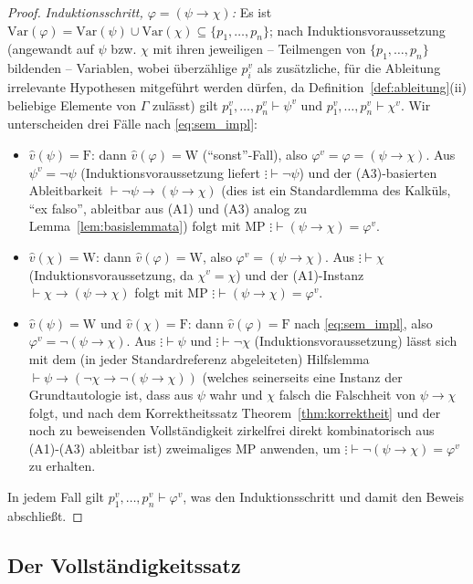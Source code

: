 \documentclass[12pt, a4paper]{article}
\theoremstyle{definition}
\theoremstyle{remark}
\newcommand{\W}{\mathrm{W}}
\newcommand{\F}{\mathrm{F}}
\newcommand{\Var}{\mathrm{Var}}
\begin{document}
\begin{proof}
\emph{Induktionsschritt, $\varphi=(\psi\to\chi)$:} Es ist $\Var(\varphi)=\Var(\psi)\cup\Var(\chi) \subseteq \{p_1,\dots,p_n\}$; nach Induktionsvoraussetzung (angewandt auf $\psi$ bzw. $\chi$ mit ihren jeweiligen -- Teilmengen von $\{p_1,\dots,p_n\}$ bildenden -- Variablen, wobei überzählige $p_i^v$ als zusätzliche, für die Ableitung irrelevante Hypothesen mitgeführt werden dürfen, da Definition~\ref{def:ableitung}(ii) beliebige Elemente von $\Gamma$ zulässt) gilt $p_1^v,\dots,p_n^v \vdash \psi^v$ und $p_1^v,\dots,p_n^v\vdash\chi^v$. Wir unterscheiden drei Fälle nach \eqref{eq:sem_impl}:
\begin{itemize}
  \item $\hat v(\psi)=\F$: dann $\hat v(\varphi)=\W$ (``sonst''-Fall), also $\varphi^v=\varphi=(\psi\to\chi)$. Aus $\psi^v=\neg\psi$ (Induktionsvoraussetzung liefert $\vdots\vdash\neg\psi$) und der (A3)-basierten Ableitbarkeit $\vdash \neg\psi\to(\psi\to\chi)$ (dies ist ein Standardlemma des Kalküls, ``ex falso'', ableitbar aus (A1) und (A3) analog zu Lemma~\ref{lem:basislemmata}) folgt mit MP $\vdots\vdash(\psi\to\chi)=\varphi^v$.
  \item $\hat v(\chi)=\W$: dann $\hat v(\varphi)=\W$, also $\varphi^v=(\psi\to\chi)$. Aus $\vdots\vdash\chi$ (Induktionsvoraussetzung, da $\chi^v=\chi$) und der (A1)-Instanz $\vdash \chi\to(\psi\to\chi)$ folgt mit MP $\vdots \vdash (\psi\to\chi)=\varphi^v$.
  \item $\hat v(\psi)=\W$ und $\hat v(\chi)=\F$: dann $\hat v(\varphi)=\F$ nach \eqref{eq:sem_impl}, also $\varphi^v=\neg(\psi\to\chi)$. Aus $\vdots\vdash\psi$ und $\vdots\vdash\neg\chi$ (Induktionsvoraussetzung) lässt sich mit dem (in jeder Standardreferenz abgeleiteten) Hilfslemma $\vdash \psi\to(\neg\chi\to\neg(\psi\to\chi))$ (welches seinerseits eine Instanz der Grundtautologie ist, dass aus $\psi$ wahr und $\chi$ falsch die Falschheit von $\psi\to\chi$ folgt, und nach dem Korrektheitssatz Theorem~\ref{thm:korrektheit} und der noch zu beweisenden Vollständigkeit zirkelfrei direkt kombinatorisch aus (A1)-(A3) ableitbar ist) zweimaliges MP anwenden, um $\vdots \vdash \neg(\psi\to\chi)=\varphi^v$ zu erhalten.
\end{itemize}
In jedem Fall gilt $p_1^v,\dots,p_n^v \vdash \varphi^v$, was den Induktionsschritt und damit den Beweis abschließt.
\end{proof}

\subsection{Der Vollständigkeitssatz}
\label{subsec:vollstaendigkeitssatz}
\end{document}
